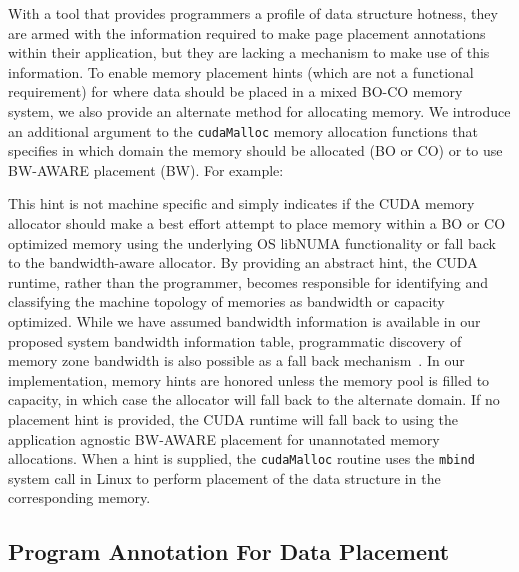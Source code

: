 With a tool that provides programmers a profile of data structure hotness, 
they are armed with the information required to
make page placement annotations within their application, but they are
lacking a mechanism to make use of this information. To enable memory placement hints (which are 
not a functional requirement) for where data 
should be placed in a mixed BO-CO memory system, we also provide an alternate method 
for allocating memory. 
We introduce an additional argument 
to the {\tt cudaMalloc} memory allocation functions that specifies in which domain the memory should be
allocated (BO or CO) or to use BW-AWARE placement (BW). For example:\\
\vspace{0.1in}

This hint is not machine specific and simply indicates if the CUDA memory allocator
should make a best effort attempt to place memory within a BO or CO optimized memory
using the underlying OS libNUMA functionality or fall back to the bandwidth-aware allocator. 
By providing an abstract hint, the CUDA runtime, rather than the programmer, becomes responsible
for identifying and classifying the machine topology of memories as bandwidth or capacity
optimized.  While we have assumed bandwidth information is available in our proposed system bandwidth 
information table, programmatic discovery of memory zone bandwidth is also possible as a fall back
mechanism~\cite{McCalpin1995}. In our implementation, memory hints are honored unless the memory pool is 
filled to capacity, in which case the allocator will fall back to the alternate domain. 
If no placement hint is provided, the CUDA runtime will fall back to using the application 
agnostic BW-AWARE placement for unannotated memory allocations.
{\color{black} When a hint is supplied, the {\tt cudaMalloc} routine uses the
{\tt mbind} system call in Linux to perform placement of the data structure in
the corresponding memory.}

\subsection{Program Annotation For Data Placement}

